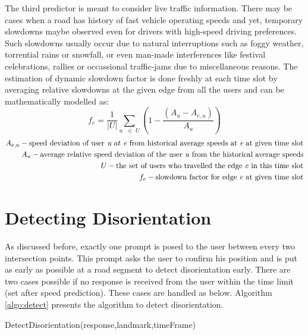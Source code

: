 \documentclass{iitkthesis}
\begin{document}
The third predictor is meant to consider live traffic information. There may be cases when a road has history of fast vehicle operating speeds and yet, temporary slowdowns maybe observed even for drivers with high-speed driving preferences. Such slowdowns usually occur due to natural interruptions such as foggy weather, torrential rains or snowfall, or even man-made interferences like festival celebrations, rallies or occassional traffic-jams due to miscellaneous reasons. The estimation of dynamic slowdown factor is done freshly at each time slot by averaging relative slowdowns at the given edge from all the users and can be mathematically modelled as:
\[\displaystyle f_{e} = \frac{1}{|U|}\sum_{u \text{ } \in \textit{ U}}(1-\frac{(A_u - A_{e,u})}{A_u})\]  
\begin{align*}
A_{e,u} - \text{speed deviation of user} \textit{ u } at \textit{ e } \text{from historical average speeds at }\textit{e} \text{ at given time slot} \\
A_u - \text{average relative speed deviation of the user \textit{u} from the historical average speeds} \\
U - \text{the set of users who travelled the edge \textit{e} in this time slot} \\
f_e - \text{slowdown factor for edge \textit{e} at given time slot}
\end{align*}
\section{Detecting Disorientation}
As discussed before, exactly one prompt is posed to the user between every two intersection points. This prompt asks the user to confirm his position and is put as early as possible at a road segment to detect disorientation early. There are two cases possible if no response is received from the user within the time limit (set after speed prediction). These cases are handled as below. Algorithm \ref{algo:detect} presents the algorithm to detect disorientation.


\begin{algorithm}[H]
\label{algo:detect}
\SetVline
\dontprintsemicolon
{}
\BlankLine

\caption{DetectDisorientation(response,landmark,timeFrame)}
\end{algorithm}
\end{document}
